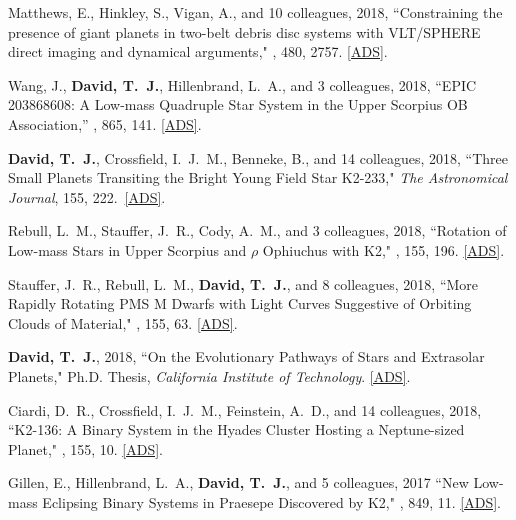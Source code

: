 \item {Matthews}, E., {Hinkley}, S., {Vigan}, A., and 10 colleagues, 2018, ``{Constraining the presence of giant planets in two-belt debris disc systems with VLT/SPHERE direct imaging and dynamical arguments}," \mnras, 480, 2757. \href{https://ui.adsabs.harvard.edu/#abs/2018MNRAS.480.2757M}{[ADS]}.

\item {Wang}, J., {\bf {David}, T.~J.}, {Hillenbrand}, L.~A., and 3 colleagues, 2018, ``{EPIC 203868608: A Low-mass Quadruple Star System in the Upper Scorpius OB Association},'' \apj, 865, 141. \href{https://ui.adsabs.harvard.edu/#abs/2018ApJ...865..141W}{[ADS]}.

\item {\bf {\bf David, T.}~J.}, {Crossfield}, I.~J.~M., {Benneke}, B., and 14 colleagues, 2018, ``{Three Small Planets Transiting the Bright Young Field Star K2-233}," \textit{The Astronomical Journal}, 155, 222.\ \href{https://ui.adsabs.harvard.edu/#abs/2018AJ....155..222D/}{[ADS]}. 

\item {Rebull}, L.~M., {Stauffer}, J.~R., {Cody}, A.~M., and 3 colleagues, 2018, ``{Rotation of Low-mass Stars in Upper Scorpius and {\ensuremath{\rho}} Ophiuchus with K2}," \aj, 155, 196. \href{https://ui.adsabs.harvard.edu/#abs/2018AJ....155..196R}{[ADS]}.

\item {Stauffer}, J.~R., {Rebull}, L.~M., {\bf {David}, T.~J.}, and 8 colleagues, 2018, ``{More Rapidly Rotating PMS M Dwarfs with Light Curves Suggestive of Orbiting Clouds of Material}," \aj, 155, 63. \href{https://ui.adsabs.harvard.edu/#abs/2018AJ....155...63S}{[ADS]}.

\item {\bf {David}, T.~J.}, 2018, ``{On the Evolutionary Pathways of Stars and Extrasolar Planets}," Ph.D. Thesis, \textit{California Institute of Technology}. \href{https://ui.adsabs.harvard.edu/abs/2018PhDT........38D/abstract}{[ADS]}.

\item {Ciardi}, D.~R., {Crossfield}, I.~J.~M., {Feinstein}, A.~D., and 14 colleagues, 2018, ``{K2-136: A Binary System in the Hyades Cluster Hosting a Neptune-sized Planet}," \aj, 155, 10. \href{https://ui.adsabs.harvard.edu/#abs/2018AJ....155...10C}{[ADS]}.

\item {Gillen}, E., {Hillenbrand}, L.~A., {\bf {David}, T.~J.}, and 5 colleagues, 2017 ``{New Low-mass Eclipsing Binary Systems in Praesepe Discovered by K2}," \apj, 849, 11. \href{https://ui.adsabs.harvard.edu/#abs/2017ApJ...849...11G}{[ADS]}.

